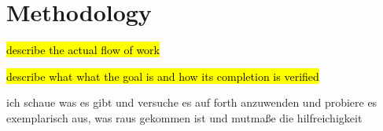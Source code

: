 \chapter{Methodology}

\hl{describe the actual flow of work}

\hl{describe what what the goal is and how its completion is verified}

ich schaue was es gibt und versuche es auf forth anzuwenden und probiere es exemplarisch aus, was raus gekommen ist und mutmaße die hilfreichigkeit